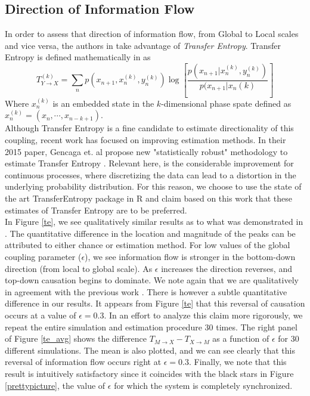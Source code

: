 \documentclass[conference]{IEEEtran}
\begin{document}
\subsection{Direction of Information Flow}
\noindent In order to assess that direction of information flow, from Global to Local scales and vice versa, the authors in \cite{Walker} take advantage of {\it Transfer Entropy}. Transfer Entropy is defined mathematically in \cite{Schreiber} as
$$T^{(k)}_{Y \rightarrow X} = \sum_n p(x_{n+1}, x_n^{(k)}, y_n^{(k)}) \log \left[ \frac{p(x_{n+1}|x_n^{(k)}, y_n^{(k)})}{p(x_{n+1}|x_n{(k)}}\right]$$
Where $x_n^{(k)}$ is an embedded state in the $k$-dimensional phase spate defined as $x_n^{(k)} = (x_n, \cdots, x_{n-k+1})$. \\



\noindent Although Transfer Entropy is a fine candidate to estimate directionality of this coupling, recent work has focused on improving estimation methods. In their 2015 paper, Gencaga et. al propose new "statistically robust" methodology to estimate Transfer Entropy \cite{recipe}. Relevant here, is the considerable improvement for continuous processes, where discretizing the data can lead to a distortion in the underlying probability distribution. For this reason, we choose to use the state of the art TransferEntropy package in R and claim based on this work that these estimates of Transfer Entropy are to be preferred. \\

\noindent In Figure \ref{te}, we see qualitatively similar results as to what was demonstrated in \cite{Walker}. The quantitative difference in the location and magnitude of the peaks can be attributed to either chance or estimation method. For low values of the global coupling parameter ($\epsilon$), we see information flow is stronger in the bottom-down direction (from local to global scale). As $\epsilon$ increases the direction reverses, and top-down causation begins to dominate. We note again that we are qualitatively in agreement with the previous work \cite{Walker}. There is however a subtle quantitative difference in our results. It appears from Figure \ref{te} that this reversal of causation occurs at a value of $\epsilon = 0.3$. In an effort to analyze this claim more rigorously, we repeat the entire simulation and estimation procedure $30$ times. The right panel of Figure \ref{te_avg} shows the difference $T_{M\rightarrow X} - T_{X \rightarrow M}$ as a function of $\epsilon$ for 30 different simulations. The mean is also plotted, and we can see clearly that this reversal of information flow occurs right at $\epsilon = 0.3$. Finally, we note that this result is intuitively satisfactory since it coincides with the black stars in Figure \ref{prettypicture}, the value of $\epsilon$ for which the system is completely synchronized.
\end{document}
